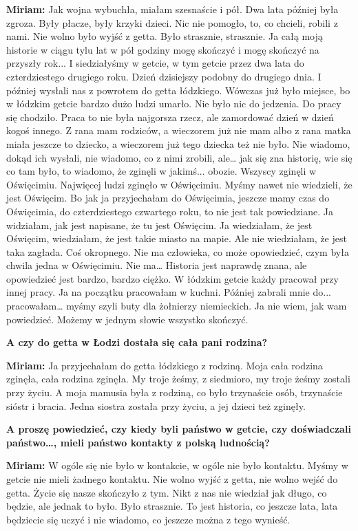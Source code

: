 \textbf{Miriam:} Jak wojna wybuchła, miałam szesnaście i pół. Dwa lata później była zgroza. Były płacze, były krzyki dzieci. Nic nie pomogło, to, co chcieli, robili z nami. Nie wolno było wyjść z getta. Było strasznie, strasznie. Ja całą moją historie w ciągu tylu lat w pół godziny mogę skończyć i mogę skończyć na przyszły rok... I siedziałyśmy w getcie, w tym getcie przez dwa lata do czterdziestego drugiego roku. Dzień dzisiejszy podobny do drugiego dnia. I później wysłali nas z powrotem do getta łódzkiego. Wówczas już było miejsce, bo w łódzkim getcie  bardzo dużo ludzi umarło. Nie było nic do jedzenia. Do pracy się chodziło. Praca to nie była najgorsza rzecz, ale zamordować dzień w dzień kogoś innego. Z rana mam rodziców, a wieczorem już nie mam albo z rana matka miała jeszcze to dziecko, a wieczorem już tego dziecka też nie było. Nie wiadomo, dokąd ich wysłali, nie wiadomo, co z nimi zrobili, ale… jak się zna historię, wie się co tam było, to wiadomo, że zginęli w jakimś... obozie. Wszyscy zginęli w Oświęcimiu. Najwięcej ludzi zginęło w Oświęcimiu. Myśmy nawet nie wiedzieli, że jest Oświęcim. Bo jak ja przyjechałam do Oświęcimia, jeszcze mamy czas do Oświęcimia, do czterdziestego czwartego roku, to nie jest tak powiedziane. Ja widziałam, jak jest napisane, że tu jest Oświęcim. Ja wiedziałam, że jest Oświęcim, wiedziałam, że jest takie miasto na mapie. Ale nie wiedziałam, że jest taka zagłada. Coś okropnego. Nie ma człowieka, co może opowiedzieć, czym była chwila jedna w Oświęcimiu. Nie ma… Historia jest naprawdę znana, ale opowiedzieć jest bardzo, bardzo ciężko. W łódzkim getcie każdy pracował przy innej pracy. Ja na początku pracowałam w kuchni. Później zabrali mnie do... pracowałam… myśmy szyli buty dla żołnierzy niemieckich. Ja nie wiem, jak wam powiedzieć. Możemy w jednym słowie wszystko skończyć. 

\textbf{A czy do getta w Łodzi dostała się cała pani rodzina?} 

\textbf{Miriam:} Ja przyjechałam do getta łódzkiego z rodziną. Moja cała rodzina zginęła, cała rodzina zginęła. My troje żeśmy, z siedmioro, my troje żeśmy zostali przy życiu. A moja mamusia była z rodziną, co było trzynaście osób, trzynaście sióstr i bracia. Jedna siostra została przy życiu, a jej dzieci też zginęły. 

\textbf{A proszę powiedzieć, czy kiedy byli państwo w getcie, czy doświadczali państwo…, mieli państwo kontakty z polską ludnością?} 

\textbf{Miriam:} W ogóle się nie było w kontakcie, w ogóle nie było kontaktu. Myśmy w getcie nie mieli żadnego kontaktu. Nie wolno wyjść z getta, nie wolno wejść do getta. Życie się nasze skończyło z tym. Nikt z nas nie wiedział jak długo, co będzie, ale jednak to było. Było strasznie. To jest historia, co jeszcze lata, lata będziecie się uczyć i nie wiadomo, co jeszcze można z tego wynieść. 

